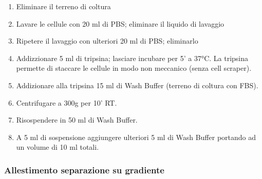 \begin{enumerate}

    \item Eliminare il terreno di coltura

    \item Lavare le cellule con 20 ml di PBS; eliminare il liquido di lavaggio

    \item Ripetere il lavaggio con ulteriori 20 ml di PBS; eliminarlo

    \item Addizzionare 5 ml di tripsina; lasciare incubare per 5' a 37°C. 
    La tripsina permette di staccare le cellule in modo non meccanico (senza cell scraper).

    \item Addizionare alla tripsina 15 ml di Wash Buffer (terreno di coltura con FBS).

    \item Centrifugare a 300g per 10' RT.

    \item Risospendere in 50 ml di Wash Buffer.

    \item A 5 ml di sospensione aggiungere ulteriori 5 ml di Wash Buffer portando 
    ad un volume di 10 ml totali.

\end{enumerate}

\subsubsection{Allestimento separazione su gradiente}

